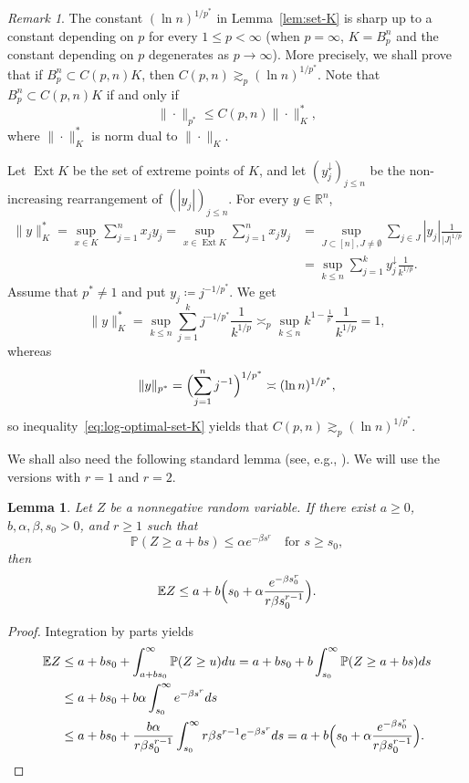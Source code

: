 \documentclass[a4paper]{amsart}
\newtheorem{lemma}[theorem]{Lemma}
\theoremstyle{definition}
\theoremstyle{remark}
\newtheorem{remark}[theorem]{Remark}
\numberwithin{equation}{section}
\newcommand*{\RR}{\mathbb{R}}
\newcommand*{\EE}{\mathbb{E}}
\newcommand*{\PP}{\mathbb{P}}
\newcommand*{\rearr}{\downarrow} %
\begin{document}
\begin{remark}
	The constant $(\ln n)^{1/p^\ast}$ in Lemma~\ref{lem:set-K} is sharp up to a constant depending on $p$ for every $1\le p<\infty$ (when $p=\infty$, $K=B_p^n$ and the constant depending on $p$ degenerates as $p \to \infty$). 
	More precisely, we shall prove that if $B_p^n \subset C(p,n) K$, then $C(p,n) \gtrsim_p (\ln n)^{1/p^\ast}$. 
	Note that $B_p^n \subset C(p,n) K$ if and only if 
	\begin{equation}
	\label{eq:log-optimal-set-K}
	\|\cdot\|_{p^\ast}\le C(p,n) \|\cdot\|_{K}^\ast,
	\end{equation} 
	where $\|\cdot\|_K^\ast$ is norm dual to $\|\cdot\|_K$.

	

	Let $\operatorname{Ext}K $ be the set of extreme points of $K$, and let $(y_j^{\rearr{}})_{j\leq n}$ be the non-increasing rearrangement of $(|y_j|)_{j\le n}$.
	For every $y\in \RR^n$,
	\begin{align*}
		\|y\|_K^\ast 
		= \sup_{x\in K} \sum_{j=1}^n x_jy_j 
		= \sup_{x\in \operatorname{Ext}K} \sum_{j=1}^n x_jy_j 
		&=\sup_{J\subset [n], J\neq \emptyset} \sum_{j\in J} |y_j| \frac{1}{|J|^{1/p}}
		\\
		&=\sup_{k \le n} \sum_{j=1}^k y_j^{\rearr{}}  \frac{1}{k^{1/p}}.
	\end{align*}
	Assume that $p^\ast \neq 1$ and put $y_j \coloneqq j^{-1/p^\ast}$. We get 
	\[
		\|y\|_K^\ast =\sup_{k\le n} \sum_{j=1}^k j^{-1/p^\ast}  \frac{1}{k^{1/p}} 
		\asymp_p
		\sup_{k\le n} k^{1-\frac 1{p^\ast}} \frac{1}{k^{1/p}} =1,
	\]
	whereas
	\[
		\|y\|_{p^\ast} = \Bigl( \sum_{j=1}^n j^{-1} \Bigr)^{1/p^\ast} \asymp (\ln n)^{1/p^\ast},
	\]
	so  inequality~\eqref{eq:log-optimal-set-K} yields that $C(p,n) \gtrsim_p (\ln n)^{1/p^\ast}$.
\end{remark}


We shall also need the following standard lemma (see, e.g.,
\cite[Section~1.3]{Ledoux}).
We will use the versions with $r=1$ and $r=2$.

\begin{lemma}
	\label{lem:mean-median}
	Let $Z$ be a nonnegative random variable.
	If there exist $a \geq 0$, $b, \alpha, \beta, s_0> 0$, and $r\geq 1$ such that
		\[
		\PP(Z\geq a + b s) \leq \alpha e^{-\beta s^r} \quad \text{for } s\geq s_0,
		\]
		then
		\[
		\EE Z \leq a + b \Bigl(s_0 + \alpha \frac{e^{-\beta s_0^r}}{r\beta s_0^{r-1}}\Bigr).
		\]
\end{lemma}


\begin{proof}
	Integration by parts yields
	\begin{align*}
		\EE Z &\leq a + bs_0 + \int_{a+b s_0}^\infty \PP(Z\geq u) du
		= a + bs_0 + b\int_{s_0}^\infty \PP(Z\geq a+b s) ds \\
		&\leq a + bs_0 + b\alpha\int_{s_0}^\infty e^{-\beta s^r} ds\\
		&\leq a + bs_0 + \frac{b\alpha}{r\beta s_0^{r-1}}\int_{s_0}^\infty r\beta s^{r-1} e^{-\beta s^r} ds
		= a + b \Bigl(s_0 + \alpha \frac{e^{-\beta s_0^r}}{r\beta s_0^{r-1}}\Bigr).
		\qedhere
	\end{align*}
\end{proof}
\end{document}
